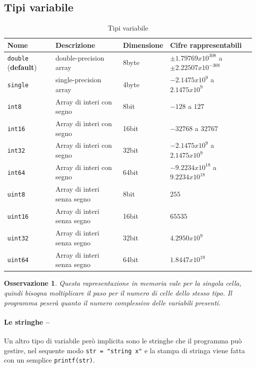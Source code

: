 \documentclass{book}
\newtheorem{oss}{Osservazione}
\begin{document}
\subsection{Tipi variabile}
\label{sec:tipivariabile}

\begin{table}[ht]
  \centering
  \begin{tabular}{llll}
    {\bf Nome} & {\bf Descrizione} & {\bf Dimensione} & {\bf Cifre rappresentabili}\\\hline
    \lstinline|double| ({\bf default}) & double-precision array & 8byte & $\pm1.79769x10^{308}$ a $\pm2.22507x10^{-308}$\\\hline
    \lstinline|single| & single-precision array & 4byte & $-2.1475x10^9$ a $2.1475x10^9$\\\hline 
    \lstinline|int8| & Array di interi con segno & 8bit & $-128$ a $127$\\\hline
    \lstinline|int16| & Array di interi con segno & 16bit & $-32768$ a $32767$ \\\hline
    \lstinline|int32| & Array di interi con segno & 32bit & $-2.1475x10^9$ a $2.1475x10^9$\\\hline 
    \lstinline|int64| & Array di interi con segno & 64bit & $-9.2234x10^{18}$ a $9.2234x10^{18}$\\\hline
    \lstinline|uint8| & Array di interi senza segno & 8bit & $255$\\\hline
    \lstinline|uint16| & Array di interi senza segno & 16bit & $65535$ \\\hline
    \lstinline|uint32| & Array di interi senza segno & 32bit & $4.2950x10^9$\\\hline 
    \lstinline|uint64| & Array di interi senza segno & 64bit & $1.8447x10^{19}$\\\hline
  \end{tabular}
  \caption{Tipi variabile}
  \label{tab:tipivariabile}
\end{table}
\begin{oss}
  Questa rapresentazione in memoria vale per la singola cella, quindi bisogna
  moltiplicare il paso per il numero di celle dello stesso tipo. Il programma
  peserà quanto il numero complessivo delle variabili presenti.
\end{oss}

\paragraph{Le stringhe --}
Un altro tipo di variabile però implicita sono le stringhe che il programma può
gestire, nel sequente modo \lstinline|str = "string x"| e la stampa di stringa
viene fatta con un semplice \lstinline|printf(str)|.
\clearpage
\end{document}
